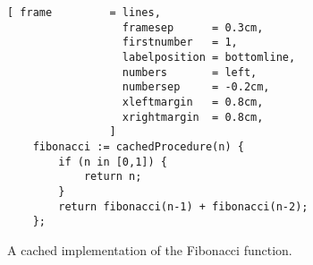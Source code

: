 \begin{figure}[!ht]
\centering
\begin{Verbatim}[ frame         = lines, 
                  framesep      = 0.3cm, 
                  firstnumber   = 1,
                  labelposition = bottomline,
                  numbers       = left,
                  numbersep     = -0.2cm,
                  xleftmargin   = 0.8cm,
                  xrightmargin  = 0.8cm,
                ]
    fibonacci := cachedProcedure(n) {
        if (n in [0,1]) {
            return n;
        } 
        return fibonacci(n-1) + fibonacci(n-2);
    };
\end{Verbatim}
\vspace*{-0.3cm}
\caption{A cached implementation of the Fibonacci function.}
\label{fig:fibonacci-cached.stlx}
\end{figure}

\vspace*{0.3cm}

